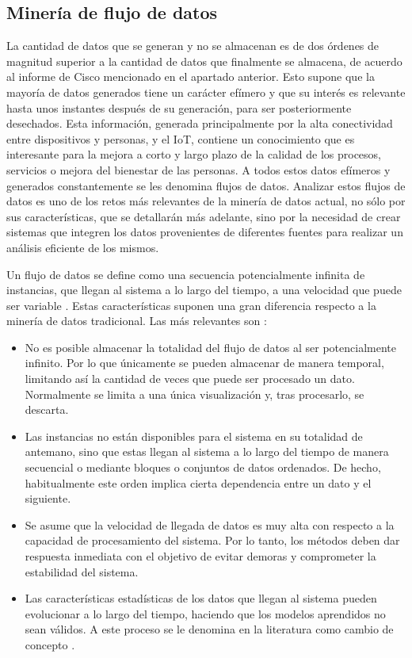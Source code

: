 \documentclass[c5paper,10pt,twoside]{book}	   	%
\begin{document}
\subsection{Minería de flujo de datos} \label{sec:ds}

La cantidad de datos que se generan y no se almacenan es de dos órdenes de magnitud superior a la cantidad de datos que finalmente se almacena, de acuerdo al informe de Cisco mencionado en el apartado anterior. Esto supone que la mayoría de datos generados tiene un carácter efímero y que su interés es relevante hasta unos instantes después de su generación, para ser posteriormente desechados. Esta información, generada principalmente por la alta conectividad entre dispositivos y personas, y el \ac{IoT}, contiene un conocimiento que es interesante para la mejora a corto y largo plazo de la calidad de los procesos, servicios o mejora del bienestar de las personas. A todos estos datos efímeros y generados constantemente se les denomina flujos de datos. Analizar estos flujos de datos es uno de los retos más relevantes de la minería de datos actual, no sólo por sus características, que se detallarán más adelante, sino por la necesidad de crear sistemas que integren los datos provenientes de diferentes fuentes para realizar un análisis eficiente de los mismos.

Un flujo de datos se define como una secuencia potencialmente infinita de instancias, que llegan al sistema a lo largo del tiempo, a una velocidad que puede ser variable \cite{Gaber12}. Estas características suponen una gran diferencia respecto a la minería de datos tradicional. Las más relevantes son \cite{Bifet09Thesis,Gama10}:

\begin{itemize}
	\item No es posible almacenar la totalidad del flujo de datos al ser potencialmente infinito. Por lo que únicamente se pueden almacenar de manera temporal, limitando así la cantidad de veces que puede ser procesado un dato. Normalmente se limita a una única visualización y, tras procesarlo, se descarta.
	
	\item Las instancias no están disponibles para el sistema en su totalidad de antemano, sino que estas llegan al sistema a lo largo del tiempo de manera secuencial o mediante bloques o conjuntos de datos ordenados. De hecho, habitualmente este orden implica cierta dependencia entre un dato y el siguiente.
	
	\item Se asume que la velocidad de llegada de datos es muy alta con respecto a la capacidad de procesamiento del sistema. Por lo tanto, los métodos deben dar respuesta inmediata con el objetivo de evitar demoras y comprometer la estabilidad del sistema.
	
	\item Las características estadísticas de los datos que llegan al sistema pueden evolucionar a lo largo del tiempo, haciendo que los modelos aprendidos no sean válidos. A este proceso se le denomina en la literatura como cambio de concepto \cite{Kshg18}.
\end{itemize}
\end{document}

